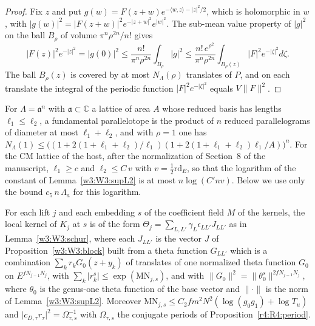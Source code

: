 \begin{proof}
Fix $z$ and put $g(w)=F(z+w)e^{-\langle w,z\rangle-\lvert z\rvert^2/2}$, which is holomorphic in $w$, with $\lvert g(w)\rvert^2=\lvert F(z+w)\rvert^2e^{-\lvert z+w\rvert^2}e^{\lvert w\rvert^2}$. The sub-mean value property of $\lvert g\rvert^2$ on the ball $B_\rho$ of volume $\pi^n\rho^{2n}/n!$ gives
\[
\lvert F(z)\rvert^2e^{-\lvert z\rvert^2}=\lvert g(0)\rvert^2\le\frac{n!}{\pi^n\rho^{2n}}\int_{B_\rho}\lvert g\rvert^2\le\frac{n!\,e^{\rho^2}}{\pi^n\rho^{2n}}\int_{B_\rho(z)}\lvert F\rvert^2e^{-\lvert\zeta\rvert^2}d\zeta .
\]
The ball $B_\rho(z)$ is covered by at most $N_\Lambda(\rho)$ translates of $P$, and on each translate the integral of the periodic function $\lvert F\rvert^2e^{-\lvert\zeta\rvert^2}$ equals $V\lVert F\rVert^2$.
\end{proof}

For $\Lambda=\mathfrak a^n$ with $\mathfrak a\subset\mathbb C$ a lattice of area $A$ whose reduced basis has lengths $\ell_1\le\ell_2$, a fundamental parallelotope is the product of $n$ reduced parallelograms of diameter at most $\ell_1+\ell_2$, and with $\rho=1$ one has $N_\Lambda(1)\le\big((1+2(1+\ell_1+\ell_2)/\ell_1)(1+2(1+\ell_1+\ell_2)\ell_1/A)\big)^n$. For the CM lattice of the host, after the normalization of Section~8 of the manuscript, $\ell_1\ge c$ and $\ell_2\le C\,v$ with $v=\frac12\mathrm{rd}_E$, so that the logarithm of the constant of Lemma~\ref{w3:W3:supL2} is at most $n\log(C'nv)$. Below we use only the bound $c_5\,n\,\Lambda_a$ for this logarithm.

\begin{hypothesis}\label{w3:W3:K3}
For each lift $j$ and each embedding $s$ of the coefficient field $M$ of the kernels, the local kernel of $K_j$ at $s$ is of the form $\Theta_j=\sum_{L,L'}\gamma_L\epsilon_{LL'}J_{LL'}$ as in Lemma~\ref{w3:W3:schur}, where each $J_{LL'}$ is the vector $J$ of Proposition~\ref{w3:W3:block} built from a theta function $G_{LL'}$ which is a combination $\sum_kr_kG_0(z+y_k)$ of translates of one normalized theta function $G_0$ on $E^{fN_{j-1}N_j}$, with $\sum_k\lvert r_k^{s}\rvert\le\exp(\mathrm{MN}_{j,s})$, and with $\lVert G_0\rVert^2=\lVert\theta_0^{s}\rVert^{2fN_{j-1}N_j}$, where $\theta_0$ is the genus-one theta function of the base vector and $\lVert\cdot\rVert$ is the norm of Lemma~\ref{w3:W3:supL2}. Moreover $\mathrm{MN}_{j,s}\le C_2fm^2N^2(\log(g_0g_1)+\log T_u)$ and $\lvert c_{D,\tau}r_\tau\rvert^2=\Omega_{\tau,s}^{-1}$ with $\Omega_{\tau,s}$ the conjugate periods of Proposition~\ref{r4:R4:period}.
\end{hypothesis}

